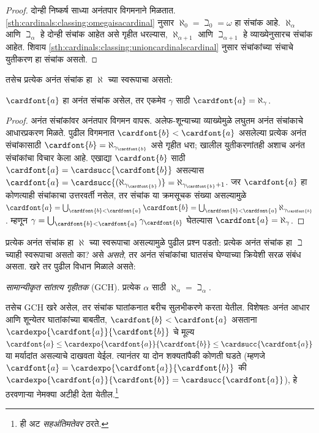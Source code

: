 \begin{proof}
दोन्ही निष्कर्ष साध्या अनंतपार विगमनाने मिळतात. \ref{sth:cardinals:classing:omegaisacardinal} नुसार $\aleph_0 =
\beth_0 = \omega$ हा संचांक आहे. $\aleph_\alpha$ आणि $\beth_\alpha$ हे दोन्ही संचांक आहेत असे गृहीत धरल्यास, $\aleph_{\alpha+1}$ आणि $\beth_{\alpha+1}$ हे व्याख्येनुसारच संचांक आहेत. शिवाय \ref{sth:cardinals:classing:unioncardinalscardinal} नुसार संचांकांच्या संचाचे युतीकरण हा संचांक असतो.
\end{proof}
\noindent
तसेच प्रत्येक अनंत संचांक हा $\aleph$ च्या स्वरूपाचा असतो:

\begin{prop}
$\cardfont{a}$ हा अनंत संचांक असेल, तर एकमेव $\gamma$ साठी $\cardfont{a} =
\aleph_\gamma$.
\end{prop}

\begin{proof}
अनंत संचांकांवर अनंतपार विगमन वापरू. अलेफ-शून्याच्या व्याख्येमुळे लघुतम अनंत संचांकाचे आधारप्रकरण मिळते. पुढील विगमनात $\cardfont{b} < \cardfont{a}$ असलेल्या प्रत्येक अनंत संचांकासाठी $\cardfont{b} =
\aleph_{\gamma_\cardfont{b}}$ असे गृहीत धरा; खालील युतीकरणांतही अशाच अनंत संचांकांचा विचार केला आहे. एखाद्या $\cardfont{b}$ साठी $\cardfont{a} =
\cardsucc{\cardfont{b}}$ असल्यास $\cardfont{a} =
\cardsucc{(\aleph_{\gamma_\cardfont{b}})}=
\aleph_{\gamma_\cardfont{b}+1}$. जर $\cardfont{a}$ हा कोणत्याही संचांकाचा उत्तरवर्ती नसेल, तर संचांक या क्रमसूचक संख्या असल्यामुळे $\cardfont{a} = \bigcup_{\cardfont{b} < \cardfont{a}} \cardfont{b} =
\bigcup_{\cardfont{b} < \cardfont{a}}{\aleph_{\gamma_\cardfont{b}}}$.
म्हणून $\gamma =
\bigcup_{\cardfont{b} < \cardfont{a}}\gamma_\cardfont{b}$ घेतल्यास $\cardfont{a} = \aleph_\gamma$.
\end{proof}

प्रत्येक अनंत संचांक हा $\aleph$ च्या स्वरूपाचा असल्यामुळे पुढील प्रश्न पडतो: प्रत्येक अनंत संचांक हा $\beth$ च्याही स्वरूपाचा असतो का? असे \emph{असते}, तर अनंत संचांकांचा घातसंच घेण्याच्या क्रियेशी सरळ संबंध असता. खरे तर पुढील विधान मिळाले असते:

\begin{defish}
\emph{सामान्यीकृत सांतत्य गृहीतक} (GCH). प्रत्येक $\alpha$ साठी $\aleph_\alpha = \beth_\alpha$.
\end{defish}

तसेच GCH खरे असेल, तर संचांक घातांकनात बरीच सुलभीकरणे करता येतील. विशेषतः अनंत आधार आणि शून्येतर घातांकांच्या बाबतीत, $\cardfont{b} < \cardfont{a}$ असताना $\cardexpo{\cardfont{a}}{\cardfont{b}}$ चे मूल्य
$\cardfont{a}\leq \cardexpo{\cardfont{a}}{\cardfont{b}} \leq
\cardsucc{\cardfont{a}}$ या मर्यादांत असल्याचे दाखवता येईल. त्यानंतर या दोन शक्यतांपैकी कोणती घडते (म्हणजे $\cardfont{a} = \cardexpo{\cardfont{a}}{\cardfont{b}}$ की $\cardexpo{\cardfont{a}}{\cardfont{b}} =
\cardsucc{\cardfont{a}}$), हे ठरवणाऱ्या नेमक्या अटीही देता येतील.\footnote{ही अट \emph{सहअंतिमतेवर} ठरते.}

